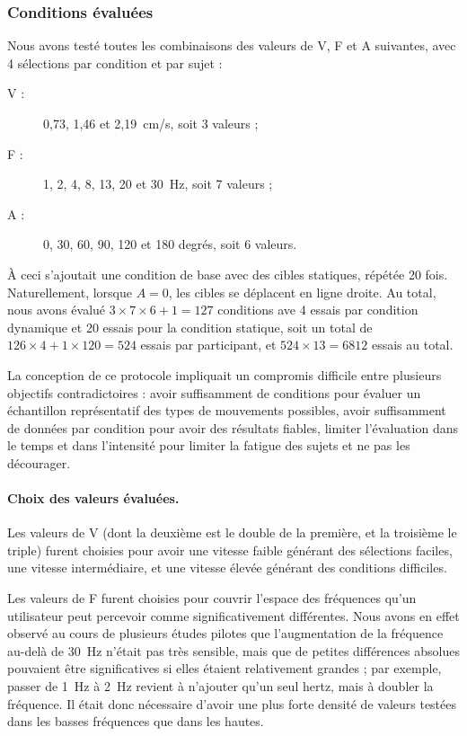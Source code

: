 	\subsubsection{Conditions évaluées}
	Nous avons testé toutes les combinaisons des valeurs de V, F et A suivantes, avec 4 sélections par condition et par sujet :
	
	\begin{description}
		\item[V :] 0,73, 1,46 et 2,19~cm/s, soit 3 valeurs ;
		\item[F :] 1, 2, 4, 8, 13, 20 et 30~Hz, soit 7 valeurs ;
		\item[A :] 0, 30, 60, 90, 120 et 180 degrés, soit 6 valeurs.
	\end{description}
	
	À ceci s'ajoutait une condition de base avec des cibles statiques, répétée 20 fois. Naturellement, lorsque $A = 0$, les cibles se déplacent en ligne droite. Au total, nous avons évalué $3 \times 7 \times 6 + 1 = 127$ conditions ave 4 essais par condition dynamique et 20 essais pour la condition statique, soit un total de $126 \times 4 + 1 \times 120 = 524$ essais par participant, et $524 \times 13 = 6812$ essais au total.
	
	La conception de ce protocole impliquait un compromis difficile entre plusieurs objectifs contradictoires : avoir suffisamment de conditions pour évaluer un échantillon représentatif des types de mouvements possibles, avoir suffisamment de données par condition pour avoir des résultats fiables, limiter l'évaluation dans le temps et dans l'intensité pour limiter la fatigue des sujets et ne pas les décourager.
	
	\paragraph{Choix des valeurs évaluées.}
	Les valeurs de V (dont la deuxième est le double de la première, et la troisième le triple) furent choisies pour avoir une vitesse faible générant des sélections faciles, une vitesse intermédiaire, et une vitesse élevée générant des conditions difficiles.
	
	Les valeurs de F furent choisies pour couvrir l'espace des fréquences qu'un utilisateur peut percevoir comme significativement différentes. Nous avons en effet observé au cours de plusieurs études pilotes que l'augmentation de la fréquence au-delà de 30~Hz n'était pas très sensible, mais que de petites différences absolues pouvaient être significatives si elles étaient relativement grandes ; par exemple, passer de 1~Hz à 2~Hz revient à n'ajouter qu'un seul hertz, mais à doubler la fréquence. Il était donc nécessaire d'avoir une plus forte densité de valeurs testées dans les basses fréquences que dans les hautes.
	
